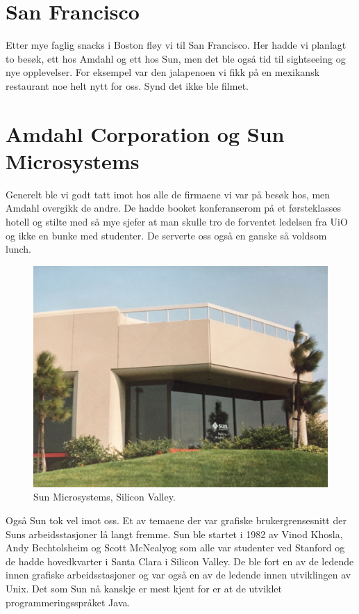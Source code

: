\documentclass[../../main.tex]{subfiles}
\begin{document}
\section{San Francisco}

Etter mye faglig snacks i Boston fløy vi til San Francisco. Her hadde vi planlagt to besøk, ett hos Amdahl og ett hos Sun, men det ble også tid til sightseeing og nye opplevelser. For eksempel var den jalapenoen vi fikk på en mexikansk restaurant noe helt nytt for oss. Synd det ikke ble filmet. 

\section{Amdahl Corporation og Sun Microsystems}

Generelt ble vi godt tatt imot hos alle de firmaene vi var på besøk hos, men Amdahl overgikk de andre. De hadde booket konferanserom på et førsteklasses hotell og stilte med så mye sjefer at man skulle tro de forventet ledelsen fra UiO og ikke en bunke med studenter. De serverte oss også en ganske så voldsom lunch.

\begin{figure}
	\includegraphics[width=\linewidth]{images/usa88/IMG_3847.jpg}
	\caption{Sun Microsystems, Silicon Valley.}
\end{figure}

Også Sun tok vel imot oss. Et av temaene der var grafiske brukergrensesnitt der Suns arbeidsstasjoner lå langt fremme. Sun ble startet i 1982 av Vinod Khosla, Andy Bechtolsheim og Scott McNealyog som alle var studenter ved Stanford og de hadde hovedkvarter i Santa Clara i Silicon Valley. De ble fort en av de ledende innen grafiske arbeidsstasjoner og var også en av de ledende innen utviklingen av Unix. Det som Sun nå kanskje er mest kjent for er at de utviklet programmeringsspråket Java.
\end{document}
